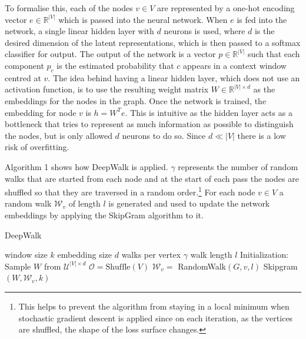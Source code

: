 \documentclass[a4paper]{article}
\begin{document}
To formalise this, each of the nodes $v \in V$ are represented by a one-hot
encoding vector $e \in \mathbb{R}^{|V|}$ which is passed into the
neural network. When $e$ is fed into the network, a single linear hidden layer with
$d$ neurons is used, where $d$ is the desired dimension of the latent
representations, which is then passed to a softmax classifier for output. The
output of the network is a vector $p\in \mathbb{R}^{|V|}$ such that each component $p_c$ is the estimated
probability that $c$ appears in a context window centred at $v$.
The idea behind having a linear hidden layer, which does not use an activation
function, is to use the resulting weight matrix $W \in \mathbb{R}^{|V| \times
  d}$ as the embeddings for the nodes in the graph. Once the network is trained, the embedding for node $v$ is $h = W^Te$. This is intuitive as
the hidden layer acts as a bottleneck that tries to represent as much
information as possible to distinguish the nodes, but is only allowed $d$
neurons to do so. Since $d \ll |V|$ there is a low risk of overfitting.

Algorithm 1 shows how DeepWalk is applied. $\gamma$ represents the number of
random walks that are started from each node and at the start of each pass the
nodes are shuffled so that they are traversed in a random order.\footnote{This
  helps to prevent the algorithm from staying in a local minimum when stochastic
  gradient descent is applied since on each iteration, as the vertices
  are shuffled, the shape of the loss surface changes.} For each node
$v \in V$ a random walk $\mathcal{W}_v$ of length $l$ is generated and used to
update the network embeddings by applying the SkipGram algorithm to it.

\begin{algorithm}[h!]
  \caption{DeepWalk}
  \begin{algorithmic}[1]
    \Statex window size $k$
    \Statex embedding size $d$
    \Statex walks per vertex $\gamma$
    \Statex walk length $l$
    \State Initialization: Sample $W$ from $\mathcal{U}^{|V| \times d}$
    \State $\mathcal{O} = \text{Shuffle}(V)$
    \State $\mathcal{W}_v =$ RandomWalk$(G, v, l)$
    \State Skipgram$(W, \mathcal{W}_v, k)$
    \EndFor
    \EndFor
  \end{algorithmic}
\end{algorithm}
\end{document}
